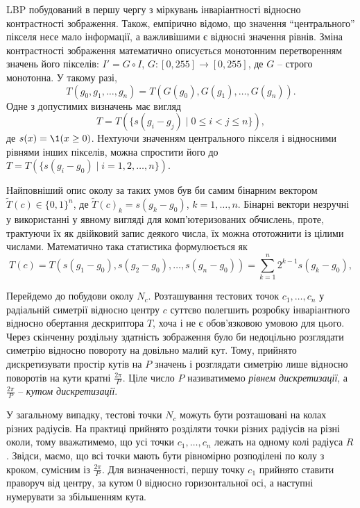 LBP побудований в першу чергу з міркувань інваріантності відносно контрастності зображення.
Також, емпірично відомо, що значення ``центрального'' пікселя несе мало інформації, а важливішими є відносні значення рівнів.  
Зміна контрастності зображення математично описується монотонним перетворенням значень його пікселів: $I' = G \circ I$, $G \colon [0,255] \to [0,255]$, де $G$ -- строго монотонна.
У такому разі, 
\begin{equation*}
    T(g_0, g_1, \dots , g_n) = T(G(g_0), G(g_1), \dots , G(g_n)).
\end{equation*}
Одне з допустимих визначень має вигляд 
\begin{equation*}
    T = T(\{s(g_i - g_j) \mid 0\le i<j \le n\}), 
\end{equation*}
де $s(x) = \1(x \ge 0)$. 
Нехтуючи значенням центрального пікселя і відносними рівнями інших пікселів, можна спростити його до $T = T(\{s(g_i - g_0) \mid i=1,2,\dots,n\})$.

Найповніший опис околу за таких умов був би самим бінарним вектором $\tilde T(c) \in \{0,1\}^n$,
де $\tilde T(c)_k = s(g_k - g_0)$, $k=1,\dots,n$.
Бінарні вектори незручні у використанні у явному вигляді для комп'ютеризованих обчислень, проте, трактуючи їх як двійковий запис деякого числа, 
їх можна ототожнити із цілими числами. Математично така статистика формулюється як 
\begin{equation}\label{e:ojala-T}
    T(c) = T(s(g_1 - g_0), s(g_2 - g_0), \dots , s(g_n - g_0)) = \sum_{k=1}^n 2^{k-1}s(g_k-g_0),
\end{equation}

Перейдемо до побудови околу $N_c$. 
Розташування тестових точок $c_1,\dots ,c_n$ у 
радіальній симетрії відносно центру $c$ суттєво полегшить розробку інваріантного відносно обертання дескриптора $T$, хоча і не є обов'язковою умовою для цього.
Через скінченну роздільну здатність зображення було би недоцільно розглядати симетрію відносно повороту на довільно малий кут.
Тому, прийнято дискретизувати простір кутів на $P$ значень і розглядати симетрію лише відносно поворотів на кути кратні $\frac{2\pi}{P}$.
Ціле число $P$ називатимемо \emph{рівнем дискретизації}, а $\frac{2\pi}{P}$ -- \emph{кутом дискретизації}. 

У загальному випадку, тестові точки $N_c$ можуть бути розташовані на колах різних радіусів. 
На практиці прийнято розділяти точки різних радіусів на різні околи, тому вважатимемо, що усі точки $c_1,\dots ,c_n$ лежать на одному колі радіуса $R$.
Звідси, маємо, що всі точки мають бути рівномірно розподілені по колу з кроком, сумісним із $\frac{2\pi}{P}$.
Для визначенності, першу точку $c_1$ прийнято ставити праворуч від центру, за кутом 0 відносно горизонтальної осі, а наступні нумерувати за збільшенням кута.

